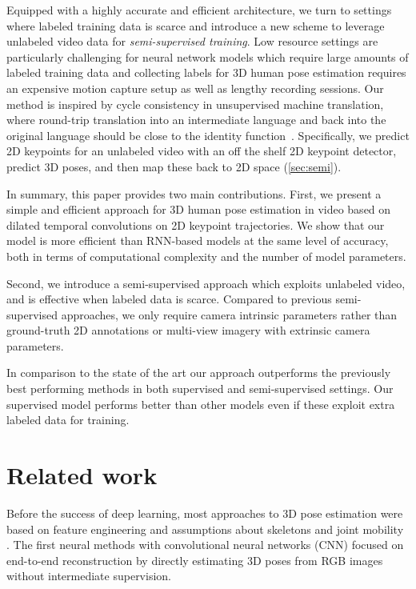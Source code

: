 \documentclass[10pt,twocolumn,letterpaper]{article}
\begin{document}
Equipped with a highly accurate and efficient architecture, we turn to settings where labeled training data is scarce and introduce a new scheme to leverage unlabeled video data for \emph{semi-supervised training}.
Low resource settings are particularly challenging for neural network models which require large amounts of labeled training data and collecting labels for 3D human pose estimation requires an expensive motion capture setup as well as lengthy recording sessions.
Our method is inspired by cycle consistency in unsupervised machine translation, where round-trip translation into an intermediate language and back into the original language should be close to the identity function~\cite{sennrich2016bpe,lample2017unsupervised,edunov2018bt}.
Specifically, we predict 2D keypoints for an unlabeled video with an off the shelf 2D keypoint detector, predict 3D poses, and then map these back to 2D space (\textsection\ref{sec:semi}).

In summary, this paper  provides two main contributions.
First, we present a simple and efficient approach for 3D human pose estimation in video based on dilated temporal convolutions on 2D keypoint trajectories. We show that our model is more efficient than RNN-based models at the same level of accuracy, both in terms of computational complexity and the number of model parameters.

Second, we introduce a semi-supervised approach which exploits unlabeled video, and is effective when labeled data is scarce. Compared to previous semi-supervised approaches, we only require camera intrinsic parameters rather than ground-truth 2D annotations or multi-view imagery with extrinsic camera parameters.

In comparison to the state of the art our approach outperforms the previously best performing methods in both supervised and semi-supervised settings. Our supervised model performs better than other models even if these exploit extra labeled data for training.

















\section{Related work}
\label{sec:pose_related}
Before the success of deep learning, most approaches to 3D pose estimation were based on feature engineering and assumptions about skeletons and joint mobility \cite{sminchisescu:3d:2008, ramakrishna:reconstructing:2012, ionescu:human36:2014, ionescu:iterated:2014}.
The first neural methods with convolutional neural networks (CNN) focused on end-to-end reconstruction \cite{li:3d:2014, tekin:direct:2016, tekin:structured:2016, pavlakos:coarse:2017} by directly estimating 3D poses from RGB images without intermediate supervision.
\end{document}
